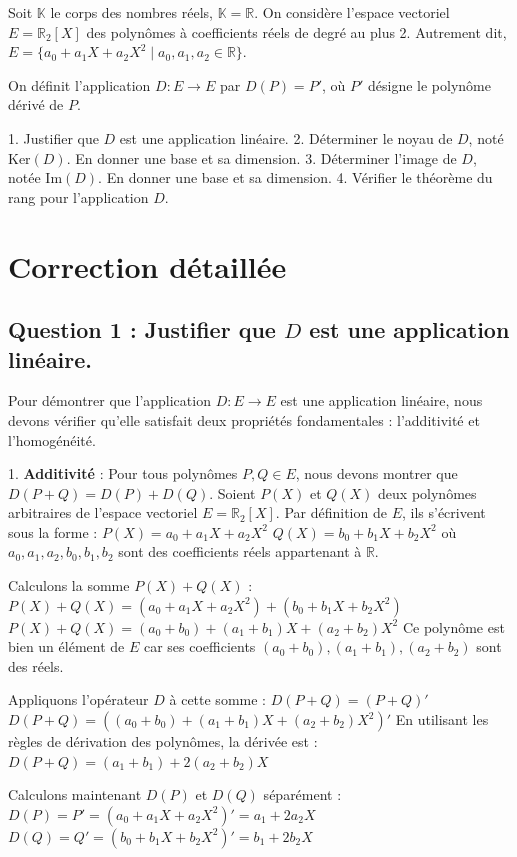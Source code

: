 \documentclass{report}
\begin{document}
Soit $\mathbb{K}$ le corps des nombres réels, $\mathbb{K} = \mathbb{R}$.
On considère l'espace vectoriel $E = \mathbb{R}_2[X]$ des polynômes à coefficients réels de degré au plus 2. Autrement dit, $E = \{ a_0 + a_1 X + a_2 X^2 \mid a_0, a_1, a_2 \in \mathbb{R} \}$.

On définit l'application $D: E \to E$ par $D(P) = P'$, où $P'$ désigne le polynôme dérivé de $P$.

1.  Justifier que $D$ est une application linéaire.
2.  Déterminer le noyau de $D$, noté $\text{Ker}(D)$. En donner une base et sa dimension.
3.  Déterminer l'image de $D$, notée $\text{Im}(D)$. En donner une base et sa dimension.
4.  Vérifier le théorème du rang pour l'application $D$.

\section*{Correction détaillée}

\subsection*{Question 1 : Justifier que $D$ est une application linéaire.}

Pour démontrer que l'application $D: E \to E$ est une application linéaire, nous devons vérifier qu'elle satisfait deux propriétés fondamentales : l'additivité et l'homogénéité.

1.  \textbf{Additivité} : Pour tous polynômes $P, Q \in E$, nous devons montrer que $D(P+Q) = D(P) + D(Q)$.
    Soient $P(X)$ et $Q(X)$ deux polynômes arbitraires de l'espace vectoriel $E = \mathbb{R}_2[X]$.
    Par définition de $E$, ils s'écrivent sous la forme :
    $P(X) = a_0 + a_1 X + a_2 X^2$
    $Q(X) = b_0 + b_1 X + b_2 X^2$
    où $a_0, a_1, a_2, b_0, b_1, b_2$ sont des coefficients réels appartenant à $\mathbb{R}$.

    Calculons la somme $P(X) + Q(X)$ :
    $P(X) + Q(X) = (a_0 + a_1 X + a_2 X^2) + (b_0 + b_1 X + b_2 X^2)$
    $P(X) + Q(X) = (a_0+b_0) + (a_1+b_1)X + (a_2+b_2)X^2$
    Ce polynôme est bien un élément de $E$ car ses coefficients $(a_0+b_0), (a_1+b_1), (a_2+b_2)$ sont des réels.

    Appliquons l'opérateur $D$ à cette somme :
    $D(P+Q) = (P+Q)'$
    $D(P+Q) = ((a_0+b_0) + (a_1+b_1)X + (a_2+b_2)X^2)'$
    En utilisant les règles de dérivation des polynômes, la dérivée est :
    $D(P+Q) = (a_1+b_1) + 2(a_2+b_2)X$

    Calculons maintenant $D(P)$ et $D(Q)$ séparément :
    $D(P) = P' = (a_0 + a_1 X + a_2 X^2)' = a_1 + 2a_2 X$
    $D(Q) = Q' = (b_0 + b_1 X + b_2 X^2)' = b_1 + 2b_2 X$
\end{document}
